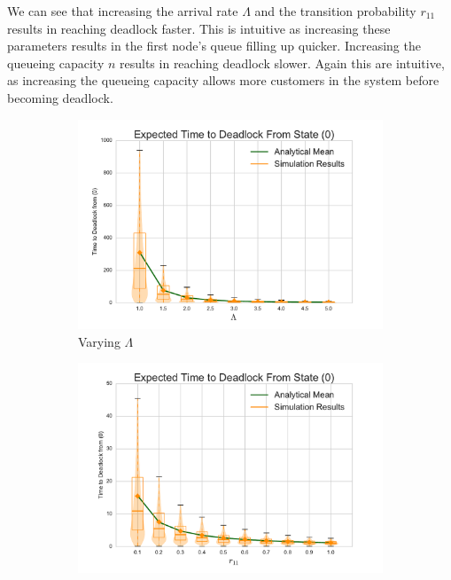 \documentclass{article}
\begin{document}
We can see that increasing the arrival rate $\Lambda$ and the transition probability $r_{11}$ results in reaching deadlock faster.
This is intuitive as increasing these parameters results in the first node's queue filling up quicker.
Increasing the queueing capacity $n$ results in reaching deadlock slower.
Again this are intuitive, as increasing the queueing capacity allows more customers in the system before becoming deadlock.


\begin{figure}[!htbp]
\begin{subfigure}[b]{0.5\textwidth}
  \includegraphics[width=\textwidth]{images/varyL}
  \caption{Varying $\Lambda$}
  \label{fig:timestodeadlock_L}
\end{subfigure}
\begin{subfigure}[b]{0.5\textwidth}
  \includegraphics[width=\textwidth]{images/varyr11}

\end{subfigure}
\end{figure}
\end{document}
